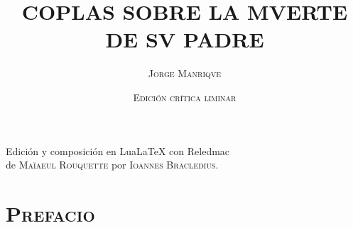 \documentclass[11pt,a4paper,twoside]{article}
\title{\huge COPLAS SOBRE LA MVERTE DE SV PADRE}
\author{\huge\textsc{Jorge Manriqve}}
\date{\vspace{60pt} \textsc{Edición crítica liminar}\\\fontsize{40}{11}\selectfont{\vfill\LaTeX}}
\begin{document}
	{
	\maketitle
}
	\newpage
%
\hskip0pt
\vfill
\begin{flushright}
	Edición y composición en LuaLaTeX con Reledmac\\ de \textsc{Maïaeul Rouquette} por \textsc{Ioannes Bracledius}.
\end{flushright}
\newpage
%
\tableofcontents
\newpage
%
\setcounter{page}{1}
\section*{\centering \textsc{Prefacio}}
\end{document}
